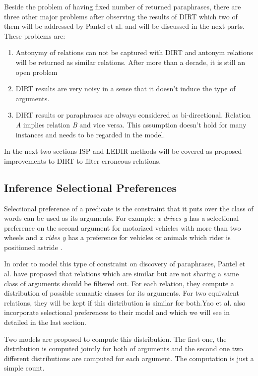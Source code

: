\documentclass[12pt]{report}
\begin{document}
  Beside the problem of having fixed number of returned paraphrases, there are three other major 
  problems after observing the results of DIRT which two of them will be addressed by Pantel et al. and
  will be discussed in the next parts. These problems are:
  
  \begin{enumerate}
    \item Antonymy of relations can not be captured with DIRT and antonym relations will be returned as similar relations. After more than
    a decade, it is still an open problem
    \item DIRT results are very noisy in a sense that it doesn't induce the type of arguments.
    \item DIRT results or paraphrases are always considered as bi-directional. Relation \emph{A} implies relation \emph{B} and vice versa.
    This assumption doesn't hold for many instances and needs to be regarded in the model.
  \end{enumerate}
  
In the next two sections ISP and LEDIR methods will be covered as proposed improvements to DIRT to filter erroneous relations.
   

\subsection{Inference Selectional Preferences}
\label{ch:sel-pref} 

Selectional preference of a predicate is the constraint that it puts over the class of words can be used as its arguments.
For example: \emph{x drives y} has a selectional preference on the second argument for motorized 
vehicles with more than two wheels and \emph {x rides y}
has a preference for vehicles or animals which rider is positioned astride \cite{Mechura2008} .

In order to model this type of constraint on discovery of paraphrases, Pantel et al. \cite{Pantel2007} have proposed that
relations which are similar but are not sharing a same class of arguments should be filtered out. For each relation, 
they compute a distribution of possible semantic classes for its arguments. For two equivalent relations, they will be kept
if this distribution is similar for both.Yao et al. \cite{Yao2011} also incorporate selectional preferences to their model and which we
will see in detailed in the last section.

Two models are proposed to compute this distribution. The first one, the distribution is computed jointly for both of arguments
and the second one two different distributions are computed for each argument. The computation is just a simple count.
\end{document}
